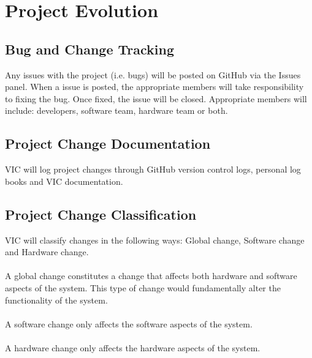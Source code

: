 \documentclass [12pt]{article}
\begin{document}
\section{Project Evolution}

\subsection{Bug and Change Tracking}
Any issues with the project (i.e. bugs) will  be posted on GitHub via the Issues panel. When a issue is posted, the appropriate members will take responsibility to fixing the bug. Once fixed, the issue will be closed. Appropriate members will include: developers, software team, hardware team or both. 

\subsection{Project Change Documentation}
VIC will log project changes through GitHub version control logs, personal log books and VIC documentation. 

\subsection{Project Change Classification}
VIC will classify changes in the following ways: Global change, Software change and Hardware change. \\\\
A global change constitutes a change that affects both hardware and software aspects of the system. This type of change would fundamentally alter the functionality of the system. \\ \\
A software change only affects the software aspects of the system. \\\\
A hardware change only affects the hardware aspects of the system.   




\end{document}
